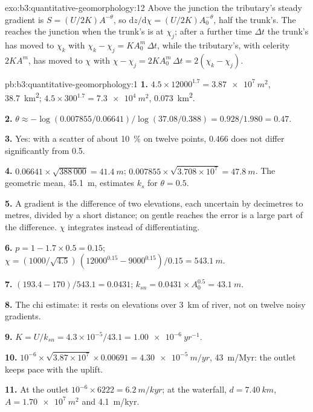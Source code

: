 \begin{solution}{exo:b3:quantitative-geomorphology:12}
Above the junction the tributary's steady gradient is $S = (U/2K)A^{-\theta}$,
so $\mathrm{d}z/\mathrm{d}\chi = (U/2K)A_0^{-\theta}$, half the trunk's.
The  reaches the junction when the trunk's is at $\chi_j$; after a
further time $\Delta t$ the trunk's has moved to $\chi_k$ with $\chi_k -
\chi_j = K A_0^m\,\Delta t$, while the tributary's, with celerity $2KA^m$,
has moved to $\chi$ with $\chi - \chi_j = 2KA_0^m\,\Delta t = 2(\chi_k -
\chi_j)$.
\end{solution}

\begin{solution}{pb:b3:quantitative-geomorphology:1}
\textbf{1.} $4.5\times12000^{1.7} = \qty{3.87e7}{m^2}$, \qty{38.7}{km^2};
$4.5\times300^{1.7} = \qty{7.3e4}{m^2}$, \qty{0.073}{km^2}.

\textbf{2.} $\theta \approx -\log(0.007855/0.06641)/\log(37.08/0.388) =
0.928/1.980 = 0.47$.

\textbf{3.} Yes: with a scatter of about \qty{10}{\percent} on twelve points,
$0.466$ does not differ significantly from 0.5.

\textbf{4.} $0.06641\times\sqrt{388\,000} = \qty{41.4}{m}$;
$0.007855\times\sqrt{3.708\times10^7} = \qty{47.8}{m}$. The geometric mean,
\qty{45.1}{m}, estimates $k_s$ for $\theta = 0.5$.

\textbf{5.} A gradient is the difference of two elevations, each uncertain
by decimetres to metres, divided by a short distance; on gentle reaches the
error is a large part of the difference. $\chi$ integrates instead of
differentiating.

\textbf{6.} $p = 1 - 1.7\times0.5 = 0.15$; $\chi = (1000/\sqrt{4.5})\,
(12000^{0.15} - 9000^{0.15})/0.15 = \qty{543.1}{m}$.

\textbf{7.} $(193.4 - 170)/543.1 = 0.0431$; $k_{sn} = 0.0431\times A_0^{0.5}
= \qty{43.1}{m}$.

\textbf{8.} The chi estimate: it rests on elevations over \qty{3}{km} of
river, not on twelve noisy gradients.

\textbf{9.} $K = U/k_{sn} = 4.3\times10^{-5}/43.1 = \qty{1.00e-6}{yr^{-1}}$.

\textbf{10.} $10^{-6}\times\sqrt{3.87\times10^7}\times0.00691 =
\qty{4.30e-5}{m/yr}$, \qty{43}{m/Myr}: the outlet keeps pace with the
uplift.

\textbf{11.} At the outlet $10^{-6}\times6222 = \qty{6.2}{m/kyr}$; at the
waterfall, $d = \qty{7.40}{km}$, $A = \qty{1.70e7}{m^2}$ and
\qty{4.1}{m/kyr}.


\end{solution}

